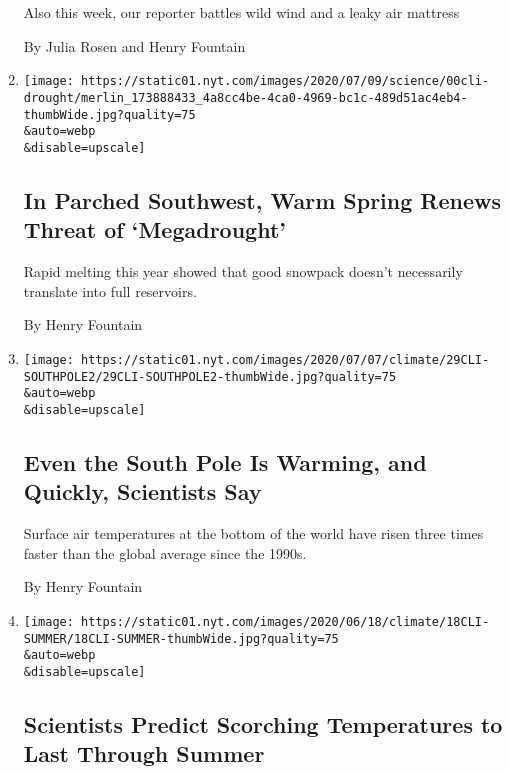 \begin{enumerate}
  Also this week, our reporter battles wild wind and a leaky air
  mattress

  By Julia Rosen and Henry Fountain
\item
  \href{/2020/07/08/climate/southwest-megadrought-climate-change.html}{}

  \texttt{[image: https://static01.nyt.com/images/2020/07/09/science/00cli-drought/merlin\_173888433\_4a8cc4be-4ca0-4969-bc1c-489d51ac4eb4-thumbWide.jpg?quality=75\\\&auto=webp\\\&disable=upscale]}

  \hypertarget{in-parched-southwest-warm-spring-renews-threat-of-megadrought}{%
  \subsection{In Parched Southwest, Warm Spring Renews Threat of
  `Megadrought'}\label{in-parched-southwest-warm-spring-renews-threat-of-megadrought}}

  Rapid melting this year showed that good snowpack doesn't necessarily
  translate into full reservoirs.

  By Henry Fountain
\item
  \href{/2020/06/29/climate/south-pole-warming-climate-change.html}{}

  \texttt{[image: https://static01.nyt.com/images/2020/07/07/climate/29CLI-SOUTHPOLE2/29CLI-SOUTHPOLE2-thumbWide.jpg?quality=75\\\&auto=webp\\\&disable=upscale]}

  \hypertarget{even-the-south-pole-is-warming-and-quickly-scientists-say}{%
  \subsection{Even the South Pole Is Warming, and Quickly, Scientists
  Say}\label{even-the-south-pole-is-warming-and-quickly-scientists-say}}

  Surface air temperatures at the bottom of the world have risen three
  times faster than the global average since the 1990s.

  By Henry Fountain
\item
  \href{/2020/06/18/climate/summer-weather-prediction.html}{}

  \texttt{[image: https://static01.nyt.com/images/2020/06/18/climate/18CLI-SUMMER/18CLI-SUMMER-thumbWide.jpg?quality=75\\\&auto=webp\\\&disable=upscale]}

  \hypertarget{scientists-predict-scorching-temperatures-to-last-through-summer}{%
  \subsection{Scientists Predict Scorching Temperatures to Last Through
  Summer}\label{scientists-predict-scorching-temperatures-to-last-through-summer}}


\end{enumerate}
